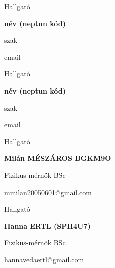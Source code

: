 \documentclass[12pt]{article}
\begin{document}
\begin{titlepage}
\vfill

\begin{minipage}[t]{0.47\textwidth}
    \centering

    {\Large {Hallgató}\par}

    \vspace{0.1cm}

    {\bfseries
    név (neptun kód)\par}
     {\normalsize
    szak\par}
    {\normalsize
    email}
    
\end{minipage}
\hfill
\begin{minipage}[t]{0.47\textwidth}
    \centering

    {\Large {Hallgató}\par}
   

    \vspace{0.1cm}

    {\bfseries
    név (neptun kód)\par}
     {\normalsize
    szak\par}
    {\normalsize
    email}
    
    
\end{minipage}

\vspace{0.5cm}

\begin{minipage}[t]{0.47\textwidth}
    \centering

    {\Large {Hallgató}\par}

    \vspace{0.1cm}

    {\bfseries
    Milán MÉSZÁROS BGKM9O\par}
     {\normalsize
    Fizikus-mérnök BSc\par}
    {\normalsize
    mmilan20050601@gmail.com}
    
\end{minipage}
\hfill
\begin{minipage}[t]{0.47\textwidth}
    \centering

    {\Large {Hallgató}\par}
   

    \vspace{0.1cm}

    {\bfseries
    Hanna ERTL (SPH4U7)\par}
    {\normalsize
    Fizikus-mérnök BSc\par}
    {\normalsize
    hannavedaertl@gmail.com}
    
    
\end{minipage}

\vspace{1cm}

\end{titlepage}
\end{document}
